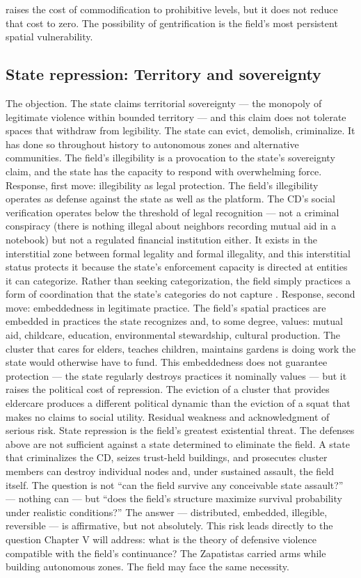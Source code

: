 raises the cost of commodification to prohibitive levels, but it does not reduce that cost to zero. The possibility of gentrification is the field’s most persistent spatial vulnerability.

\subsection{State repression: Territory and sovereignty}

The objection. The state claims territorial sovereignty — the monopoly of legitimate violence within bounded territory — and this claim does not tolerate spaces that withdraw from legibility. The state can evict, demolish, criminalize. It has done so throughout history to autonomous zones and alternative communities. The field’s illegibility is a provocation to the state’s sovereignty claim, and the state has the capacity to respond with overwhelming force. Response, first move: illegibility as legal protection. The field’s illegibility operates as defense against the state as well as the platform. The CD’s social verification operates below the threshold of legal recognition — not a criminal conspiracy (there is nothing illegal about neighbors recording mutual aid in a notebook) but not a regulated financial institution either. It exists in the interstitial zone between formal legality and formal illegality, and this interstitial status protects it because the state’s enforcement capacity is directed at entities it can categorize. Rather than seeking categorization, the field simply practices a form of coordination that the state’s categories do not capture \cite{scott_2009}. Response, second move: embeddedness in legitimate practice. The field’s spatial practices are embedded in practices the state recognizes and, to some degree, values: mutual aid, childcare, education, environmental stewardship, cultural production. The cluster that cares for elders, teaches children, maintains gardens is doing work the state would otherwise have to fund. This embeddedness does not guarantee protection — the state regularly destroys practices it nominally values — but it raises the political cost of repression. The eviction of a cluster that provides eldercare produces a different political dynamic than the eviction of a squat that makes no claims to social utility. Residual weakness and acknowledgment of serious risk. State repression is the field’s greatest existential threat. The defenses above are not sufficient against a state determined to eliminate the field. A state that criminalizes the CD, seizes trust-held buildings, and prosecutes cluster members can destroy individual nodes and, under sustained assault, the field itself. The question is not “can the field survive any conceivable state assault?” — nothing can — but “does the field’s structure maximize survival probability under realistic conditions?” The answer — distributed, embedded, illegible, reversible — is affirmative, but not absolutely. This risk leads directly to the question Chapter V will address: what is the theory of defensive violence compatible with the field’s continuance? The Zapatistas carried arms while building autonomous zones. The field may face the same necessity.

